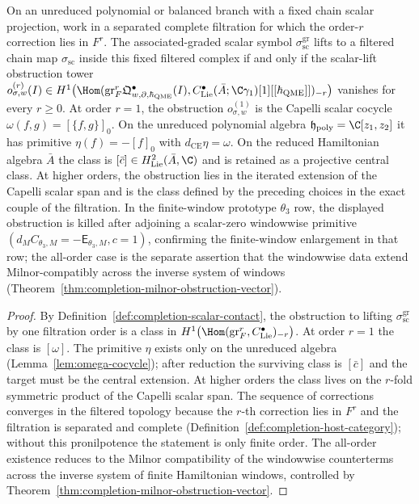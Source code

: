 \begin{thm}
\label{thm:completion-sigma-sc}
On an unreduced polynomial or balanced branch with a fixed chain scalar
projection, work in a separated complete filtration for which the
order-\(r\) correction lies in \(F^r\).  The associated-graded scalar
symbol \(\sigma_{\mathrm{sc}}^{\mathrm{gr}}\) lifts to a filtered chain
map \(\sigma_{\mathrm{sc}}\) inside this fixed filtered complex if and
only if the scalar-lift
obstruction tower
\(o^{(r)}_{\sigma,w}(I)\in H^1\bigl(
\Hom(\mathrm{gr}^r_F\mathfrak Q^\bullet_{w,\partial,\hbar_{\mathrm{QME}}}(I),
C^\bullet_{\mathrm{Lie}}(\bar A;\C\gamma_1)[1][[\hbar_{\mathrm{QME}}]])_{-r}\bigr)\)
vanishes for every \(r\ge 0\).  At order \(r=1\), the obstruction
\(o^{(1)}_{\sigma,w}\) is the Capelli scalar cocycle
\(\omega(f,g)=[\{f,g\}]_0\).  On the unreduced polynomial algebra
\(\mathfrak h_{\mathrm{poly}}=\C[z_1,z_2]\) it has primitive
\(\eta(f)=-[f]_0\) with \(d_{\mathrm{CE}}\eta=\omega\).  On the
reduced Hamiltonian algebra \(\bar A\) the class is
\([\bar c]\in H^2_{\mathrm{Lie}}(\bar A,\C)\) and is retained as a
projective central class.  At higher orders, the obstruction lies in
the iterated extension of the Capelli scalar span and is the class
defined by the preceding choices in the exact couple of the filtration.
In the
finite-window prototype \(\theta_3\) row, the displayed obstruction
is killed after adjoining a scalar-zero windowwise primitive
\((d_M C_{\theta_3,M}=-\mathsf E_{\theta_3,M},c=1)\), confirming
the finite-window enlargement in that row; the all-order case is the
separate assertion that the windowwise data extend
Milnor-compatibly across the inverse system of windows
(Theorem~\ref{thm:completion-milnor-obstruction-vector}).
\end{thm}

\begin{proof}
By Definition~\ref{def:completion-scalar-contact}, the obstruction
to lifting \(\sigma_{\mathrm{sc}}^{\mathrm{gr}}\) by one
filtration order is a class in
\(H^1\bigl(\Hom(\mathrm{gr}^r_F,C^\bullet_{\mathrm{Lie}})_{-r}\bigr)\).
At order \(r=1\) the class is \([\omega]\).  The primitive
\(\eta\) exists only on the unreduced algebra
(Lemma~\ref{lem:omega-cocycle}); after reduction the surviving class
is \([\bar c]\) and the target must be the central extension.  At
higher orders the class lives on the \(r\)-fold symmetric product of
the Capelli scalar span.  The sequence of corrections converges in the
filtered topology because the \(r\)-th correction lies in \(F^r\) and
the filtration is separated and complete
(Definition~\ref{def:completion-host-category}); without this
pronilpotence the statement is only finite order.  The all-order
existence reduces to the Milnor compatibility of the windowwise
counterterms across the inverse system of finite Hamiltonian
windows, controlled by
Theorem~\ref{thm:completion-milnor-obstruction-vector}.
\end{proof}

